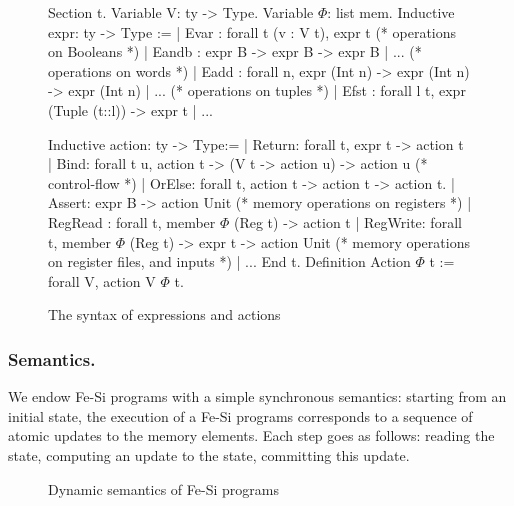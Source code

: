 \documentclass{llncs}
\begin{document}
\begin{figure}
  \centering
\begin{coq}
Section t. 
Variable V: ty -> Type. Variable $\Phi$: list mem. 
Inductive expr: ty -> Type :=
| Evar : forall t (v : V t), expr t
(* operations on Booleans *)
| Eandb : expr B -> expr B -> expr B | ... 
(* operations on words *)
| Eadd : forall n, expr (Int n) -> expr (Int n) -> expr (Int n) | ... 
(* operations on tuples *)
| Efst : forall l t, expr (Tuple (t::l)) -> expr t | ...

Inductive action: ty -> Type:=
| Return: forall t, expr t -> action t
| Bind: forall t u,  action  t -> (V t -> action u) -> action u
(* control-flow *)
| OrElse: forall t, action t -> action t -> action t.
| Assert: expr B -> action Unit    
(* memory operations on registers *)
| RegRead : forall t, member $\Phi$ (Reg t) -> action t
| RegWrite: forall t, member $\Phi$ (Reg t) -> expr t -> action Unit
(* memory operations on register files, and inputs *)
| ... 
End t. 
Definition Action $\Phi$ t := forall V, action V $\Phi$ t.  
\end{coq}
  \caption{The syntax of expressions and actions}
  \label{fig:fesi}
\end{figure}

\subsubsection{Semantics.}
We endow Fe-Si programs with a simple synchronous semantics:  starting
from an initial state, the execution of a Fe-Si programs corresponds
to a sequence of atomic updates to the memory elements. 
%
Each step goes as follows: reading the state, computing an update to
the state, committing this update.
%

\begin{figure*}
  \centering
\caption{Dynamic semantics of Fe-Si programs}\label{fig:fesi-sem}
\end{figure*}
\end{document}
